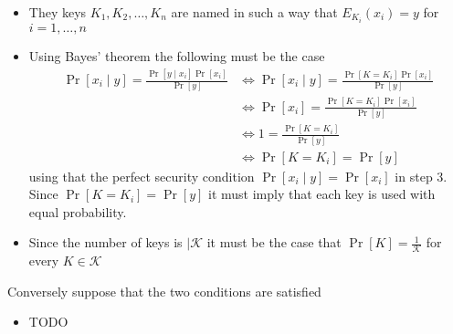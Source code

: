 \begin{itemize}
\begin{itemize}
    \item They keys $K_1, K_2, \dots, K_n$ are named in such a way that $E_{K_i}(x_i) = y$ for $i = 1,\dots, n$ 
    \item Using Bayes' theorem the following must be the case
    \begin{align*}
      \Pr[x_i \mid y] = \frac{\Pr[y \mid x_i] \Pr[x_i]}{\Pr[y]} &\Leftrightarrow \Pr[x_i \mid y] =\frac{\Pr[K = K_i] \Pr[x_i]}{\Pr[y]} \\
      &\Leftrightarrow \Pr[x_i] =\frac{\Pr[K = K_i] \Pr[x_i]}{\Pr[y]} \\
      &\Leftrightarrow 1 =\frac{\Pr[K = K_i]}{\Pr[y]} \\
      &\Leftrightarrow \Pr[K = K_i] = \Pr[y] 
    \end{align*}
    using that the perfect security condition $\Pr[x_i \mid y] = \Pr[x_i]$ in step 3. Since $\Pr[K = K_i] = \Pr[y]$ it must imply that each key is used with equal probability.
    \item Since the number of keys is $|\mathcal K$ it must be the case that $\Pr[K] = \frac{1}{\mathcal K}$ for every $K \in \mathcal K$ 
  \end{itemize}
  Conversely suppose that the two conditions are satisfied
  \begin{itemize}
  	\item TODO
  \end{itemize}

\end{itemize}

